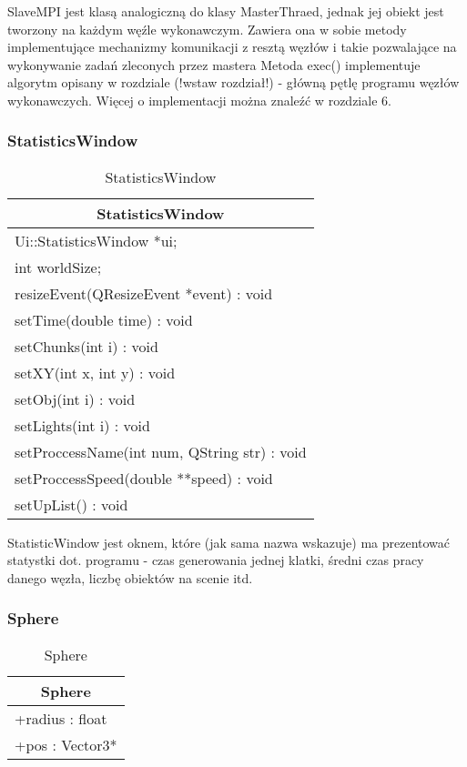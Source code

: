 SlaveMPI jest klasą analogiczną do klasy MasterThraed, jednak jej obiekt jest tworzony na każdym węźle wykonawczym. Zawiera ona w sobie metody implementujące mechanizmy komunikacji z resztą węzłów i takie pozwalające na wykonywanie zadań zleconych przez mastera  Metoda exec() implementuje algorytm opisany w rozdziale (!wstaw rozdział!) - główną pętlę programu węzłów wykonawczych. Więcej o implementacji można znaleźć w rozdziale 6.

\subsubsection{StatisticsWindow}

\footnotesize
\begin{longtable}{|p{14cm}|}
    \caption{StatisticsWindow} \label{tab:StatisticsWindow} \\ \hline
    \multicolumn{1}{|c|}{StatisticsWindow} \\ \hline
    Ui::StatisticsWindow *ui; \\
    int worldSize; \\
    \hline
	resizeEvent(QResizeEvent *event) : void \\
    setTime(double time) : void  \\
    setChunks(int i) : void \\
    setXY(int x, int y) : void \\
    setObj(int i) : void \\
    setLights(int i) : void  \\
    setProccessName(int num, QString str) : void \\
    setProccessSpeed(double **speed) : void \\
    setUpList() : void \\
    \hline
\end{longtable}
\normalsize

StatisticWindow jest oknem, które (jak sama nazwa wskazuje) ma prezentować statystki dot. programu - czas generowania jednej klatki, średni czas pracy danego węzła, liczbę obiektów na scenie itd.

\subsubsection{Sphere}

\footnotesize
\begin{longtable}{|p{14cm}|}
    \caption{Sphere} \label{tab:Sphere} \\ \hline
    \multicolumn{1}{|c|}{Sphere} \\ \hline
    +radius : float \\
    +pos : Vector3* \\
    \hline
\end{longtable}
\normalsize

